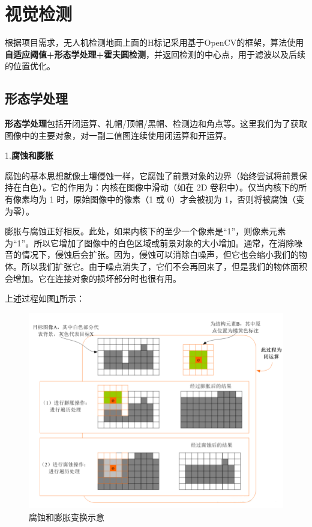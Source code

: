 \section{视觉检测}

根据项目需求，无人机检测地面上面的H标记采用基于OpenCV的框架，算法使用\textbf{自适应阈值+形态学处理+霍夫圆检测}，并返回检测的中心点，用于滤波以及后续的位置优化。

\subsection{形态学处理}

\textbf{形态学处理}包括开闭运算、礼帽/顶帽/黑帽、检测边和角点等。这里我们为了获取图像中的主要对象，对一副二值图连续使用闭运算和开运算。

1.\textbf{腐蚀和膨胀}

腐蚀的基本思想就像土壤侵蚀一样，它腐蚀了前景对象的边界（始终尝试将前景保持在白色）。它的作用为：内核在图像中滑动（如在 2D 卷积中）。仅当内核下的所有像素均为 1 时，原始图像中的像素（1 或 0）才会被视为 1，否则将被腐蚀（变为零）。

膨胀与腐蚀正好相反。此处，如果内核下的至少一个像素是“1”，则像素元素为“1”。所以它增加了图像中的白色区域或前景对象的大小增加。通常，在消除噪音的情况下，侵蚀后会扩张。因为，侵蚀可以消除白噪声，但它也会缩小我们的物体。所以我们扩张它。由于噪点消失了，它们不会再回来了，但是我们的物体面积会增加。它在连接对象的损坏部分时也很有用。

上述过程如图\ref{Fig:img0}所示：

\begin{figure}[ht]
  \centering
  \includegraphics[width=0.8\linewidth]{./Figure/Corrosion_and_Expansion.png}
  \caption{腐蚀和膨胀变换示意}\label{Fig:img0}
\end{figure}

